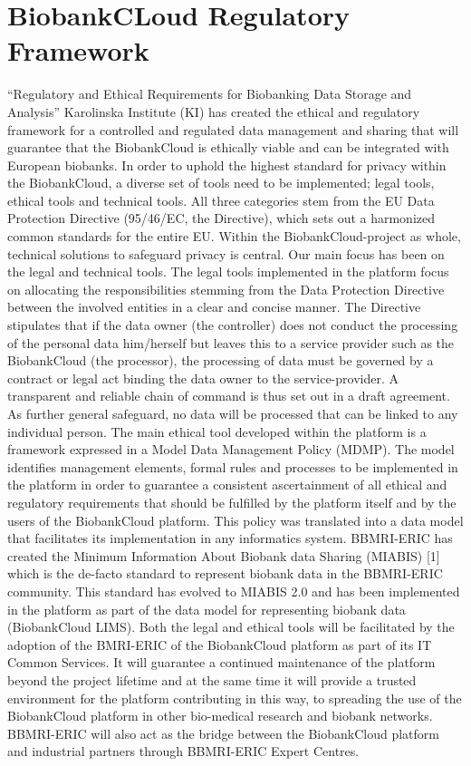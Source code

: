 \section{BiobankCLoud Regulatory Framework}
“Regulatory and Ethical Requirements for Biobanking Data Storage and Analysis”
Karolinska Institute (KI) has created the ethical and regulatory framework for a controlled and regulated data management and sharing that will guarantee that the BiobankCloud is ethically viable and can be integrated with European biobanks. In order to uphold the highest standard for privacy within the BiobankCloud, a diverse set of tools need to be implemented; legal tools, ethical tools and technical tools. All three categories stem from the EU Data Protection Directive (95/46/EC, the Directive), which sets out a harmonized common standards for the entire EU. Within the BiobankCloud-project as whole, technical solutions to safeguard privacy is central. Our main focus has been on the legal and technical tools. 
The legal tools implemented in the platform focus on allocating the responsibilities stemming from the Data Protection Directive between the involved entities in a clear and concise manner.  The Directive stipulates that if the data owner (the controller) does not conduct the processing of the personal data him/herself but leaves this to a service provider such as the BiobankCloud (the processor), the processing of data must be governed by a contract or legal act binding the data owner to the service-provider. A transparent and reliable chain of command is thus set out in a draft agreement.  As further general safeguard, no data will be processed that can be linked to any individual person.
The main ethical tool developed within the platform is a framework expressed in a Model Data Management Policy (MDMP). The model identifies management elements, formal rules and processes to be implemented in the platform in order to guarantee a consistent ascertainment of all ethical and regulatory requirements that should be fulfilled by the platform itself and by the users of the BiobankCloud platform. This policy was translated into a data model that facilitates its implementation in any informatics system. 
BBMRI-ERIC has created the Minimum Information About Biobank data Sharing (MIABIS) [1] which is the de-facto standard to represent biobank data in the BBMRI-ERIC community. This standard has evolved to MIABIS 2.0 and has been implemented in the platform as part of the data model for representing biobank data (BiobankCloud LIMS). 
Both the legal and ethical tools will be facilitated by the adoption of the BMRI-ERIC of the BiobankCloud platform as part of its IT Common Services. It will guarantee a continued maintenance of the platform beyond the project lifetime and at the same time it will provide a trusted environment for the platform contributing in this way, to spreading the use of the BiobankCloud platform in other bio-medical research and biobank networks. BBMRI-ERIC will also act as the bridge between the BiobankCloud platform and industrial partners through BBMRI-ERIC Expert Centres. 

